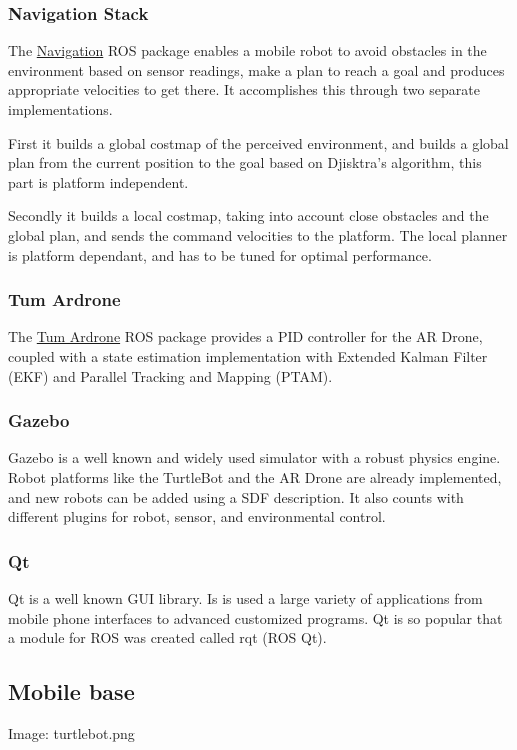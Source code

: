\documentclass[11pt,a4paper]{article}
\newcommand{\centerImage}[1]{
\begin{center}
Image: #1
\end{center}
}
\begin{document}
\subsubsection{Navigation Stack}
The \href{http://wiki.ros.org/navigation}{Navigation} ROS package enables a mobile robot to avoid obstacles in the environment based on sensor readings, make a plan to reach a goal and produces appropriate velocities to get there. It accomplishes this through two separate implementations. 

First it builds a global costmap of the perceived environment, and builds a global plan from the current position to the goal based on Djisktra's algorithm, this part is platform independent. 

Secondly it builds a local costmap, taking into account close obstacles and the global plan, and sends the command velocities to the platform. The local planner is  platform dependant, and has to be tuned for optimal performance.

\subsubsection{Tum Ardrone}
The \href{http://wiki.ros.org/tum_ardrone}{Tum Ardrone} ROS package provides a PID controller for the AR Drone, coupled with a state estimation implementation with Extended Kalman Filter (EKF) and Parallel Tracking and Mapping (PTAM).

\subsubsection{Gazebo}
Gazebo is a well known and widely used simulator with a robust physics engine. 
Robot platforms like the TurtleBot and the AR Drone are already implemented, and new robots can be added using a SDF description. It also counts with different plugins  for robot, sensor, and environmental control. 

\subsubsection{Qt}
Qt is a well known GUI library. Is is used a large variety of applications from mobile phone interfaces to advanced customized programs. Qt is so popular that a module for ROS was
created called rqt (ROS Qt).


\subsection{Mobile base}
\centerImage{turtlebot.png}
\end{document}
